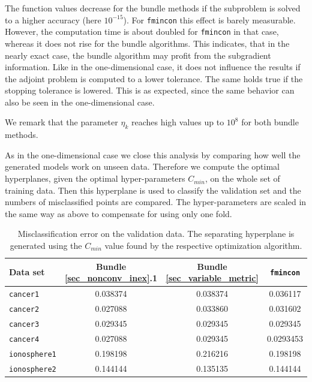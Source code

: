 The function values decrease for the bundle methods if the subproblem is solved to a higher accuracy (here \(10^{-15}\)). For \texttt{fmincon} this effect is barely measurable. 
However, the computation time is about doubled for \texttt{fmincon} in that case, whereas it does not rise for the bundle algorithms.
This indicates, that in the nearly exact case, the bundle algorithm may profit from the subgradient information.
Like in the one-dimensional case, it does not influence the results if the adjoint problem is computed to a lower tolerance.
The same holds true if the stopping tolerance is lowered.
This is as expected, since the same behavior can also be seen in the one-dimensional case.

We remark that the parameter \(\eta_k\) reaches high values up to \(10^8\) for both bundle methods.

As in the one-dimensional case we close this analysis by comparing how well the generated models work on unseen data.
Therefore we compute the optimal hyperplanes, given the optimal hyper-parameters \(C_{min}\), on the whole set of training data.
Then this hyperplane is used to classify the validation set and the numbers of misclassified points are compared.
The hyper-parameters are scaled in the same way as above to compensate for using only one fold.

\begin{table}[ht]%
\centering
\begin{tabular}{|l|c|c|c|}
	\hline
	Data set & Bundle \ref{sec_nonconv_inex}.1 & Bundle \ref{sec_variable_metric} & \texttt{fmincon} \\
	\hline
	\texttt{cancer1} & 0.038374 & 0.038374 & 0.036117\\
	\texttt{cancer2} & 0.027088 & 0.033860 & 0.031602\\
	\texttt{cancer3} & 0.029345 & 0.029345 & 0.029345\\
	\texttt{cancer4} & 0.027088 & 0.029345 & 0.0293453\\
	\texttt{ionosphere1} & 0.198198 & 0.216216 & 0.198198\\
	\texttt{ionosphere2} & 0.144144 & 0.135135 & 0.144144\\
	\hline
\end{tabular}
\caption[Misclassification error for multi-dimensional data]{Misclassification error on the validation data. The separating hyperplane is generated using the \(C_{min}\) value found by the respective optimization algorithm.}
\label{misclass_mD}
\end{table}

